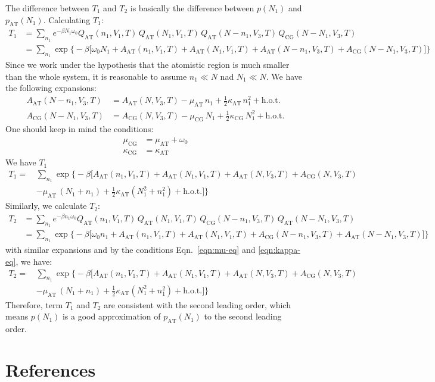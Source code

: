 \documentclass[aip,jcp,a4paper,reprint,onecolumn]{revtex4-1}
\newcommand{\AT}{{\textrm{{AT}}}}
\newcommand{\CG}{{\textrm{CG}}}
\begin{document}
The difference between $T_1$ and $T_2$ is basically the difference
between $p(N_1)$ and $p_{\AT}(N_1)$.
Calculating $T_1$:
\begin{align}\nonumber
  T_1
  &=
  \sum_{n_1}
  e^{-\beta N_1\omega_0}
  Q_{\AT}(n_1,V_1,T)\,
  Q_{\AT}(N_1,V_1,T)\,
  Q_{\AT}(N-n_1,V_3,T)\,
  Q_{\CG}(N-N_1,V_3,T) \\\nonumber
  &=
  \sum_{n_1}
  \exp
  \big\{-\beta
  \big[
  \omega_0N_1 +
  A_{\AT}(n_1,V_1,T) +
  A_{\AT}(N_1,V_1,T) +
  A_{\AT}(N-n_1,V_3,T) +
  A_{\CG}(N-N_1,V_3,T)
  \big]
  \big\}
\end{align}
Since we work under the hypothesis that the atomistic region is much smaller than the whole system, it
is reasonable to assume $n_1 \ll N$ nad $N_1\ll N$. We have the following
expansions:
\begin{align}
  A_{\AT}(N-n_1,V_3,T)
  &=
  A_{\AT}(N,V_3,T)
  - \mu_{\AT}\,n_1
  + \frac12 \kappa_{\AT}\,n_1^2 + \textrm{h.o.t.} \\
  A_{\CG}(N-N_1,V_3,T)
  &=
  A_{\CG}(N,V_3,T)
  - \mu_{\CG}\,N_1
  + \frac12 \kappa_{\CG}\,N_1^2 + \textrm{h.o.t.}
\end{align}
One should keep in mind the conditions:
\begin{align}\label{eqn:mu-eq}
  \mu_{\CG} &= \mu_{\AT} + \omega_0\\\label{eqn:kappa-eq}
  \kappa_{\CG} &= \kappa_{\AT}
\end{align}
We have $T_1$
\begin{align}\nonumber
  T_1
  = \,&
  \sum_{n_1}
  \exp
  \big\{-\beta
  \big[
  A_{\AT}(n_1,V_1,T) +
  A_{\AT}(N_1,V_1,T) +
  A_{\AT}(N,V_3,T) +
  A_{\CG}(N,V_3,T) \\
  \,&-
  \mu_{\AT}\,(N_1 + n_1) +
  \frac12 \kappa_{\AT}(N_1^2 + n_1^2) +
   \textrm{h.o.t.}
  \big]
  \big\}
\end{align}
Similarly, we calculate $T_2$:
\begin{align}\nonumber
  T_2
  &=
  \sum_{n_1}
  e^{-\beta n_1\omega_0}
  Q_{\AT}(n_1,V_1,T)\,
  Q_{\AT}(N_1,V_1,T)\,
  Q_{\CG}(N-n_1,V_3,T)\,
  Q_{\AT}(N-N_1,V_3,T) \\\nonumber
  &=
  \sum_{n_1}
  \exp
  \big\{-\beta
  \big[
  \omega_0n_1 +
  A_{\AT}(n_1,V_1,T) +
  A_{\AT}(N_1,V_1,T) +
  A_{\CG}(N-n_1,V_3,T) +
  A_{\AT}(N-N_1,V_3,T)
  \big]
  \big\}
\end{align}
with similar expansions and by the conditions Eqn.~\eqref{eqn:mu-eq}
and \eqref{eqn:kappa-eq}, we have:
\begin{align}\nonumber
  T_2
  = \,&
  \sum_{n_1}
  \exp
  \big\{-\beta
  \big[
  A_{\AT}(n_1,V_1,T) +
  A_{\AT}(N_1,V_1,T) +
  A_{\AT}(N,V_3,T) +
  A_{\CG}(N,V_3,T) \\
  \,&-
  \mu_{\AT}\,(N_1 + n_1) +
  \frac12 \kappa_{\AT}(N_1^2 + n_1^2) +
   \textrm{h.o.t.}
  \big]
  \big\}
\end{align}
Therefore, term $T_1$ and $T_2$ are consistent with  the second leading
order, which means $p(N_1)$ is a good approximation of $p_{\AT}(N_1)$
to the second leading order.



\section*{References}
{}

\end{document}
